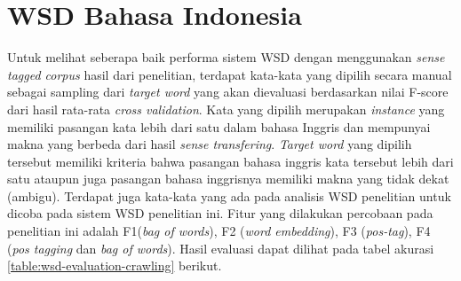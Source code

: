 \section{WSD Bahasa Indonesia}

Untuk melihat seberapa baik performa sistem WSD dengan menggunakan \textit{sense tagged corpus} hasil dari penelitian, terdapat kata-kata yang dipilih secara manual sebagai sampling dari \textit{target word} yang akan dievaluasi berdasarkan nilai F-score dari hasil rata-rata \textit{cross validation}. Kata yang dipilih merupakan \textit{instance} yang memiliki pasangan kata lebih dari satu dalam bahasa Inggris dan mempunyai makna yang berbeda dari hasil \textit{sense transfering}. \textit{Target word} yang dipilih tersebut memiliki kriteria bahwa pasangan bahasa inggris kata tersebut lebih dari satu ataupun juga pasangan bahasa inggrisnya memiliki makna yang tidak dekat (ambigu). Terdapat juga kata-kata yang ada pada analisis WSD penelitian \citep{septiantri2013wsd} untuk dicoba pada sistem WSD penelitian ini. Fitur yang dilakukan percobaan pada penelitian ini adalah F1(\textit{bag of words}), F2 (\textit{word embedding}), F3 (\textit{pos-tag}), F4 (\textit{pos tagging} dan \textit{bag of words}). Hasil evaluasi dapat dilihat pada tabel akurasi  \ref{table:wsd-evaluation-crawling} berikut.
